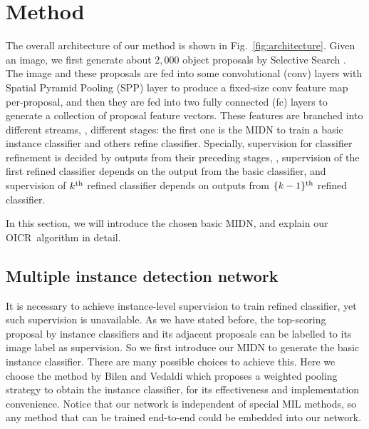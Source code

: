 \documentclass[10pt,twocolumn,letterpaper]{article}
\def\methodname{OICR}
\begin{document}
\section{Method}
\label{sec:method}

The overall architecture of our method is shown in Fig.~\ref{fig:architecture}.
Given an image, we first generate about $2,000$ object proposals by Selective Search \cite{Ref:Uijlings2013}.
The image and these proposals are fed into some convolutional (conv) layers with Spatial Pyramid Pooling (SPP) layer \cite{Ref:He2015} to produce a fixed-size conv feature map per-proposal,
and then they are fed into two fully connected (fc) layers to generate a collection of proposal feature vectors.
These features are branched into different streams, \ie, different stages: the first one is the MIDN to train a basic instance classifier and others refine classifier.
Specially, supervision for classifier refinement is decided by outputs from their preceding stages, \eg, supervision of the first refined classifier depends on the output from the basic classifier, and supervision of $k^{\textup{th}}$ refined classifier depends on outputs from $\{k-1\}^{\textup{th}}$ refined classifier.

In this section, we will introduce the chosen basic MIDN, and explain our \methodname\ algorithm in detail.


\subsection{Multiple instance detection network}
\label{sec:midn}

It is necessary to achieve instance-level supervision to train refined classifier, yet such supervision is unavailable.
As we have stated before, the top-scoring proposal by instance classifiers and its adjacent proposals can be labelled to its image label as supervision.
So we first introduce our MIDN to generate the basic instance classifier.
There are many possible choices \cite{Ref:Bilen2016,Ref:Cibis2017,Ref:Kantorov2016,Ref:Wang2015} to achieve this.
Here we choose the method by Bilen and Vedaldi \cite{Ref:Bilen2016} which proposes a weighted pooling strategy to obtain the instance classifier, for its effectiveness and implementation convenience.
Notice that our network is independent of special MIL methods, so any method that can be trained end-to-end could be embedded into our network.
\end{document}
